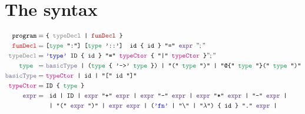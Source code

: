 \documentclass{article}
\begin{document}
	\section{The syntax}
	\begin{align*}
	\texttt{program}  =\ & \texttt{\{ \color{gray}typeDecl \color{black} | \color{red}funDecl \color{black} \}}\\
	\texttt{\color{red}funDecl\color{black}} =\ & \texttt{[\color{ForestGreen}type \color{black} ":"] [\color{ForestGreen}type \color{black} '::'] id \{ id \} "=" \color{RoyalPurple}expr \color{black}} ";"\\
	\texttt{\color{gray}typeDecl\color{black}} =\ &\texttt{\color{blue}'type' \color{black} ID \{ id \} "=" \color{RubineRed}typeCtor \color{black} \{ "|" \color{RubineRed}typeCtor \color{black} \}} ";"\\
	\texttt{\color{ForestGreen}type \color{black}} =\ &\texttt{\color{CadetBlue}basicType \color{black} | (\color{ForestGreen}type \color{black} \{ '->' \color{ForestGreen}type \color{black} \}) | "(" \color{ForestGreen}type \color{black} ")" | "@\{" \color{ForestGreen}type \color{black} "\}(" \color{ForestGreen}type \color{black} ")"}\\
	\texttt{\color{CadetBlue}basicType} =\ &	\texttt{\color{RubineRed}typeCtor \color{black}| id | "[" id "]"}\\
	\texttt{\color{RubineRed}typeCtor\color{black}} =\ & \texttt{ID \{ \color{ForestGreen}type \color{black} \}}\\
	\texttt{\color{RoyalPurple}expr\color{black}} =\ &  \texttt{
		id
		| ID
		| \color{RoyalPurple}expr \color{black} "+" \color{RoyalPurple}expr \color{black} 
		| \color{RoyalPurple}expr \color{black} "-" \color{RoyalPurple}expr \color{black} 
		| \color{RoyalPurple}expr \color{black} "*" \color{RoyalPurple}expr \color{black}
		| "-" \color{RoyalPurple}expr \color{black}
		|}\\
	&\texttt{
		| "(" \color{RoyalPurple}expr \color{black} ")" 
		| \color{RoyalPurple}expr \color{black} \color{RoyalPurple}expr \color{black} 
		| (\color{blue}'fn' \color{black} | "\char`\\" | "$\lambda$") \{ id \} "." \color{RoyalPurple}expr \color{black}
		|}\\

\end{align*}
\end{document}
